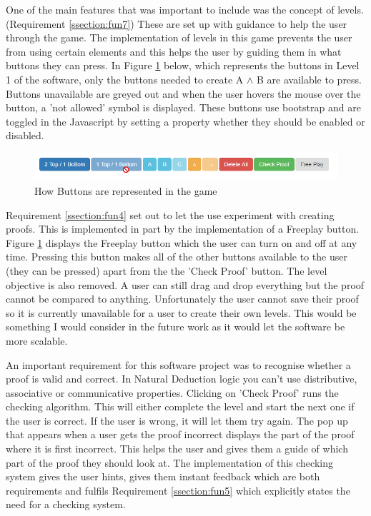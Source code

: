 One of the main features that was important to include was the concept of levels.(Requirement \ref{ssection:fun7}) These are set up with guidance to help the user through the game. The implementation of levels in this game prevents the user from using certain elements and this helps the user by guiding them in what buttons they can press. In Figure \ref{fig:buttons} below, which represents the buttons in Level 1 of the software, only the buttons needed to create A $\wedge$ B are available to press. Buttons unavailable are greyed out and when the user hovers the mouse over the button, a 'not allowed' symbol is displayed. These buttons use bootstrap and are toggled in the Javascript by setting a property whether they should be enabled or disabled.   

\begin{figure}[H]
\centering
\centerline{\includegraphics[scale=0.65]{buttons}}
\caption{How Buttons are represented in the game}
\label{fig:buttons}
\end{figure}

Requirement \ref{ssection:fun4} set out to let the use experiment with creating proofs. This is implemented in part by the implementation of a Freeplay button. Figure \ref{fig:buttons} displays the Freeplay button which the user can turn on and off at any time. Pressing this button makes all of the other buttons available to the user (they can be pressed) apart from the the 'Check Proof' button. The level objective is also removed. A user can still drag and drop everything but the proof cannot be compared to anything. Unfortunately the user cannot save their proof so it is currently unavailable for a user to create their own levels. This would be something I would consider in the future work as it would let the software be more scalable. 


An important requirement for this software project was to recognise whether a proof is valid and correct. In Natural Deduction logic you can't use distributive, associative or communicative properties. \cite{intro} Clicking on 'Check Proof' runs the checking algorithm. This will either complete the level and start the next one if the user is correct. If the user is wrong, it will let them try again. The pop up that appears when a user gets the proof incorrect displays the part of the proof where it is first incorrect. This helps the user and gives them a guide of which part of the proof they should look at. The implementation of this checking system gives the user hints, gives them instant feedback which are both requirements and fulfils Requirement \ref{ssection:fun5} which explicitly states the need for a checking system.

